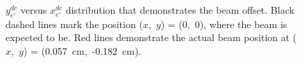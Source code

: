 \begin{figure}[!ht]
\begin{center}
\end{center}
\caption{\small $y_{e'}^{dc}$ versus $x_{e'}^{dc}$ distribution that demonstrates the beam offset. Black dashed lines mark the position ($x$,~$y$) = (0,~0), where the beam is expected to be. Red lines demonstrate the actual beam position at ($x$,~$y$) = (0.057~cm,~-0.182~cm). }
\label{fig:beam_offset}
\end{figure}





